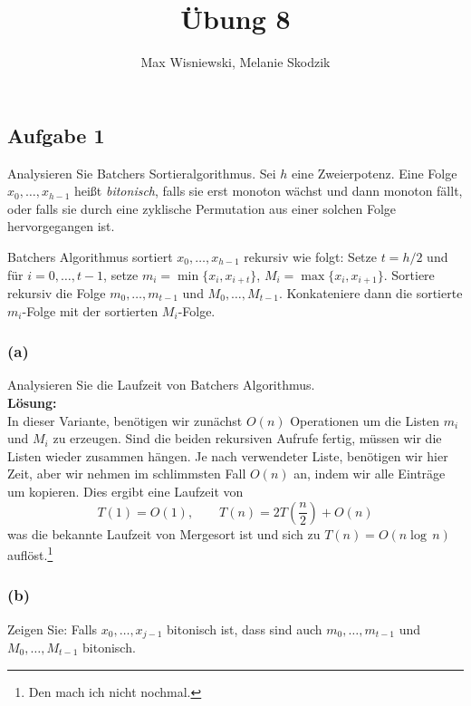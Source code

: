 \documentclass[11pt,a4paper,ngerman]{article}
\date{}
\title{Übung 8}
\author{Max Wisniewski, Melanie Skodzik}
\begin{document}

\renewcommand{\figurename}{Grafik}

\maketitle
\thispagestyle{fancy}


\subsection*{Aufgabe 1}
Analysieren Sie Batchers Sortieralgorithmus. Sei $h$ eine Zweierpotenz. Eine Folge $x_0, \ldots, x_{h-1}$ heißt \emph{bitonisch}, falls sie erst
monoton wächst und dann monoton fällt, oder falls sie durch eine zyklische Permutation aus einer solchen Folge hervorgegangen ist.

Batchers Algorithmus sortiert $x_0, \ldots, x_{h-1}$ rekursiv wie folgt: Setze $t = h / 2$ und für $i = 0, \ldots , t-1$, setze $m_i= \min \{x_i, x_{i+t}\}$, $M_i = \max \{x_i, x_{i+1} \}$. Sortiere rekursiv die Folge $m_0,\ldots, m_{t-1}$ und $M_0, \ldots, M_{t-1}$. Konkateniere dann die sortierte $m_i$-Folge mit der sortierten $M_i$-Folge.

\subsubsection*{(a)}
Analysieren Sie die Laufzeit von Batchers Algorithmus.\\

\noindent\textbf{Lösung:}\\

In dieser Variante, benötigen wir zunächst $O(n)$ Operationen um die Listen $m_i$ und $M_i$ zu erzeugen. Sind die beiden rekursiven Aufrufe fertig,
müssen wir die Listen wieder zusammen hängen. Je nach verwendeter Liste, benötigen wir hier Zeit, aber wir nehmen im schlimmsten Fall $O(n)$ an,
indem wir alle Einträge um kopieren. Dies ergibt eine Laufzeit von
$$
	T(1) = O(1), \qquad T(n) = 2T(\frac{n}{2}) + O(n)
$$
was die bekannte Laufzeit von Mergesort ist und sich zu $T(n) = O(n \log \, n)$ auflöst.\footnote{Den mach ich nicht nochmal.}

\subsubsection*{(b)}
Zeigen Sie: Falls $x_0, \ldots, x_{j-1}$ bitonisch ist, dass sind auch $m_0, \ldots, m_{t-1}$ und $M_0, \ldots, M_{t-1}$ bitonisch.\\
\end{document}

